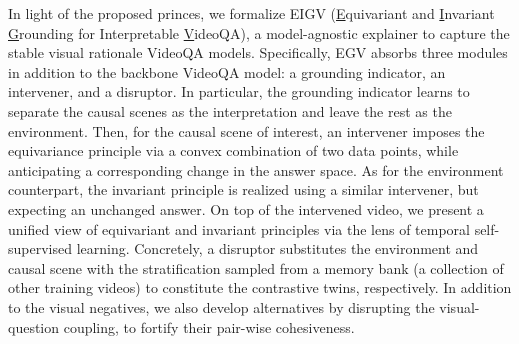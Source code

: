 

In light of the proposed princes, we formalize EIGV (\underline{E}quivariant and \underline{I}nvariant \underline{G}rounding for Interpretable \underline{V}ideoQA),
a model-agnostic explainer to capture the stable visual rationale VideoQA models.
Specifically, EGV absorbs three modules in addition to the backbone VideoQA model: a grounding indicator, an intervener, and a disruptor. 
%
In particular, the grounding indicator learns to separate the causal scenes as the interpretation and leave the rest as the environment. 
%
Then, for the causal scene of interest, an intervener imposes the equivariance principle via a convex combination of two data points, while anticipating a corresponding change in the answer space.  
%
As for the environment counterpart, the invariant principle is realized using a similar intervener, but expecting an unchanged answer.
%
%
On top of the intervened video, we present a unified view of equivariant and invariant principles via the lens of temporal self-supervised learning. 
%
Concretely, a disruptor substitutes the environment and causal scene with the stratification sampled from a memory bank (a collection of other training videos) to constitute the contrastive twins, respectively. 
%
%
In addition to the visual negatives, we also develop alternatives by disrupting the visual-question coupling, to fortify their pair-wise cohesiveness.

